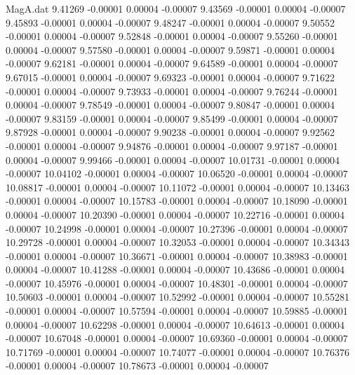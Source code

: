 \begin{filecontents}{MagA.dat}
   9.41269   -0.00001    0.00004   -0.00007
   9.43569   -0.00001    0.00004   -0.00007
   9.45893   -0.00001    0.00004   -0.00007
   9.48247   -0.00001    0.00004   -0.00007
   9.50552   -0.00001    0.00004   -0.00007
   9.52848   -0.00001    0.00004   -0.00007
   9.55260   -0.00001    0.00004   -0.00007
   9.57580   -0.00001    0.00004   -0.00007
   9.59871   -0.00001    0.00004   -0.00007
   9.62181   -0.00001    0.00004   -0.00007
   9.64589   -0.00001    0.00004   -0.00007
   9.67015   -0.00001    0.00004   -0.00007
   9.69323   -0.00001    0.00004   -0.00007
   9.71622   -0.00001    0.00004   -0.00007
   9.73933   -0.00001    0.00004   -0.00007
   9.76244   -0.00001    0.00004   -0.00007
   9.78549   -0.00001    0.00004   -0.00007
   9.80847   -0.00001    0.00004   -0.00007
   9.83159   -0.00001    0.00004   -0.00007
   9.85499   -0.00001    0.00004   -0.00007
   9.87928   -0.00001    0.00004   -0.00007
   9.90238   -0.00001    0.00004   -0.00007
   9.92562   -0.00001    0.00004   -0.00007
   9.94876   -0.00001    0.00004   -0.00007
   9.97187   -0.00001    0.00004   -0.00007
   9.99466   -0.00001    0.00004   -0.00007
  10.01731   -0.00001    0.00004   -0.00007
  10.04102   -0.00001    0.00004   -0.00007
  10.06520   -0.00001    0.00004   -0.00007
  10.08817   -0.00001    0.00004   -0.00007
  10.11072   -0.00001    0.00004   -0.00007
  10.13463   -0.00001    0.00004   -0.00007
  10.15783   -0.00001    0.00004   -0.00007
  10.18090   -0.00001    0.00004   -0.00007
  10.20390   -0.00001    0.00004   -0.00007
  10.22716   -0.00001    0.00004   -0.00007
  10.24998   -0.00001    0.00004   -0.00007
  10.27396   -0.00001    0.00004   -0.00007
  10.29728   -0.00001    0.00004   -0.00007
  10.32053   -0.00001    0.00004   -0.00007
  10.34343   -0.00001    0.00004   -0.00007
  10.36671   -0.00001    0.00004   -0.00007
  10.38983   -0.00001    0.00004   -0.00007
  10.41288   -0.00001    0.00004   -0.00007
  10.43686   -0.00001    0.00004   -0.00007
  10.45976   -0.00001    0.00004   -0.00007
  10.48301   -0.00001    0.00004   -0.00007
  10.50603   -0.00001    0.00004   -0.00007
  10.52992   -0.00001    0.00004   -0.00007
  10.55281   -0.00001    0.00004   -0.00007
  10.57594   -0.00001    0.00004   -0.00007
  10.59885   -0.00001    0.00004   -0.00007
  10.62298   -0.00001    0.00004   -0.00007
  10.64613   -0.00001    0.00004   -0.00007
  10.67048   -0.00001    0.00004   -0.00007
  10.69360   -0.00001    0.00004   -0.00007
  10.71769   -0.00001    0.00004   -0.00007
  10.74077   -0.00001    0.00004   -0.00007
  10.76376   -0.00001    0.00004   -0.00007
  10.78673   -0.00001    0.00004   -0.00007

\end{filecontents}
